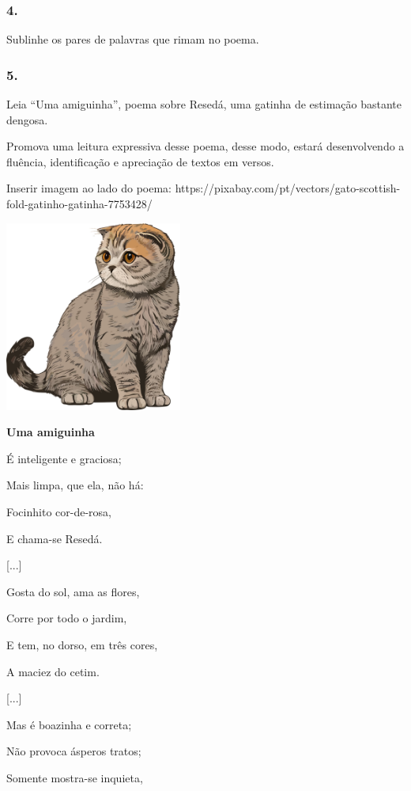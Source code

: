 \subsubsection{4. }\label{section-50}

Sublinhe os pares de palavras que rimam no poema.

\subsubsection{5. }\label{section-51}

Leia ``Uma amiguinha'', poema sobre Resedá, uma gatinha de estimação
bastante dengosa.

Promova uma leitura expressiva desse poema, desse modo, estará
desenvolvendo a fluência, identificação e apreciação de textos em
versos.

Inserir imagem ao lado do poema:
https://pixabay.com/pt/vectors/gato-scottish-fold-gatinho-gatinha-7753428/

\includegraphics[width=2.29455in,height=2.45833in]{media/image17.png}

\textbf{Uma amiguinha}

É inteligente e graciosa;

Mais limpa, que ela, não há:

Focinhito cor-de-rosa,

E chama-se Resedá.

{[}...{]}

Gosta do sol, ama as flores,

Corre por todo o jardim,

E tem, no dorso, em três cores,

A maciez do cetim.

{[}...{]}

Mas é boazinha e correta;

Não provoca ásperos tratos;

Somente mostra-se inquieta,

